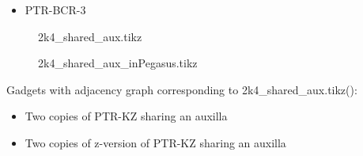 \documentclass{article}
\begin{document}
\begin{itemize}
\item PTR-BCR-3
\end{itemize}

\begin{figure}

\caption{2k4\_shared\_aux.tikz}
\end{figure}

\begin{figure}

\caption{2k4\_shared\_aux\_inPegasus.tikz}
\end{figure}

Gadgets with adjacency graph corresponding to 2k4\_shared\_aux.tikz(\scalebox{.25}{}):

\begin{itemize}
\item Two copies of PTR-KZ sharing an auxilla
\item Two copies of z-version of PTR-KZ sharing an auxilla
\end{itemize}
\end{document}
